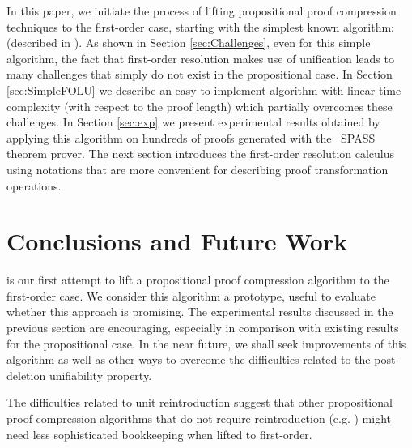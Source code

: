 \documentclass{llncs}
\begin{document}
In this paper, we initiate the process of lifting propositional proof compression techniques to the first-order case, starting with the simplest known algorithm: {\LowerUnits} (described in \cite{LURPI}). 
As shown in Section \ref{sec:Challenges}, even for this simple algorithm, the fact that first-order resolution makes use of unification leads to many challenges that simply do not exist in the propositional case. 
In Section \ref{sec:SimpleFOLU} we describe an easy to implement algorithm with  linear time complexity (with respect to the proof length) which partially overcomes these challenges. 
In Section \ref{sec:exp} we present experimental results obtained by applying this algorithm on hundreds of proofs generated with the{\
SPASS} theorem prover. 
The next section introduces the first-order resolution calculus using notations that are more convenient for describing proof transformation operations.













\section{Conclusions and Future Work}

{\SFOLowerUnits} is our first attempt to lift a propositional proof compression algorithm to the first-order case. We consider this algorithm a prototype, useful to evaluate whether this approach is promising. The experimental results discussed in the previous section are encouraging, especially in comparison with existing results for the propositional case. In the near future, we shall seek improvements of this algorithm as well as other ways to overcome the difficulties related to the post-deletion unifiability property.

The difficulties related to unit reintroduction suggest that other propositional proof compression algorithms that do not require reintroduction (e.g. {\RecyclePivotsIntersection} \cite{LURPI}) might need less sophisticated bookkeeping when lifted to first-order.
\end{document}
